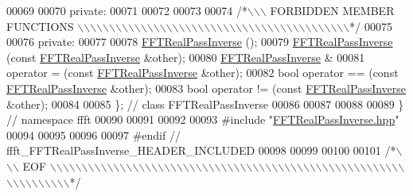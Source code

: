 \begin{DoxyCode}
00069 
00070 \textcolor{keyword}{private}:
00071 
00072 
00073 
00074 \textcolor{comment}{/*\(\backslash\)\(\backslash\)\(\backslash\) FORBIDDEN MEMBER FUNCTIONS \(\backslash\)\(\backslash\)\(\backslash\)\(\backslash\)\(\backslash\)\(\backslash\)\(\backslash\)\(\backslash\)\(\backslash\)\(\backslash\)\(\backslash\)\(\backslash\)\(\backslash\)\(\backslash\)\(\backslash\)\(\backslash\)\(\backslash\)\(\backslash\)\(\backslash\)\(\backslash\)\(\backslash\)\(\backslash\)\(\backslash\)\(\backslash\)\(\backslash\)\(\backslash\)\(\backslash\)\(\backslash\)\(\backslash\)\(\backslash\)\(\backslash\)\(\backslash\)\(\backslash\)\(\backslash\)\(\backslash\)\(\backslash\)\(\backslash\)\(\backslash\)\(\backslash\)\(\backslash\)\(\backslash\)\(\backslash\)\(\backslash\)*/}
00075 
00076 \textcolor{keyword}{private}:
00077 
00078                         \hyperlink{a00014}{FFTRealPassInverse} ();
00079                         \hyperlink{a00014}{FFTRealPassInverse} (\textcolor{keyword}{const} 
      \hyperlink{a00014}{FFTRealPassInverse} &other);
00080     \hyperlink{a00014}{FFTRealPassInverse} &
00081                         operator = (\textcolor{keyword}{const} \hyperlink{a00014}{FFTRealPassInverse} &other);
00082     \textcolor{keywordtype}{bool}                operator == (\textcolor{keyword}{const} \hyperlink{a00014}{FFTRealPassInverse} &other);
00083     \textcolor{keywordtype}{bool}                operator != (\textcolor{keyword}{const} \hyperlink{a00014}{FFTRealPassInverse} &other);
00084 
00085 \};  \textcolor{comment}{// class FFTRealPassInverse}
00086 
00087 
00088 
00089 \}   \textcolor{comment}{// namespace ffft}
00090 
00091 
00092 
00093 \textcolor{preprocessor}{#include    "\hyperlink{a00103}{FFTRealPassInverse.hpp}"}
00094 
00095 
00096 
00097 \textcolor{preprocessor}{#endif  // ffft\_FFTRealPassInverse\_HEADER\_INCLUDED}
00098 
00099 
00100 
00101 \textcolor{comment}{/*\(\backslash\)\(\backslash\)\(\backslash\) EOF \(\backslash\)\(\backslash\)\(\backslash\)\(\backslash\)\(\backslash\)\(\backslash\)\(\backslash\)\(\backslash\)\(\backslash\)\(\backslash\)\(\backslash\)\(\backslash\)\(\backslash\)\(\backslash\)\(\backslash\)\(\backslash\)\(\backslash\)\(\backslash\)\(\backslash\)\(\backslash\)\(\backslash\)\(\backslash\)\(\backslash\)\(\backslash\)\(\backslash\)\(\backslash\)\(\backslash\)\(\backslash\)\(\backslash\)\(\backslash\)\(\backslash\)\(\backslash\)\(\backslash\)\(\backslash\)\(\backslash\)\(\backslash\)\(\backslash\)\(\backslash\)\(\backslash\)\(\backslash\)\(\backslash\)\(\backslash\)\(\backslash\)\(\backslash\)\(\backslash\)\(\backslash\)\(\backslash\)\(\backslash\)\(\backslash\)\(\backslash\)\(\backslash\)\(\backslash\)\(\backslash\)\(\backslash\)\(\backslash\)\(\backslash\)\(\backslash\)\(\backslash\)\(\backslash\)\(\backslash\)\(\backslash\)\(\backslash\)\(\backslash\)\(\backslash\)\(\backslash\)\(\backslash\)*/}
\end{DoxyCode}
